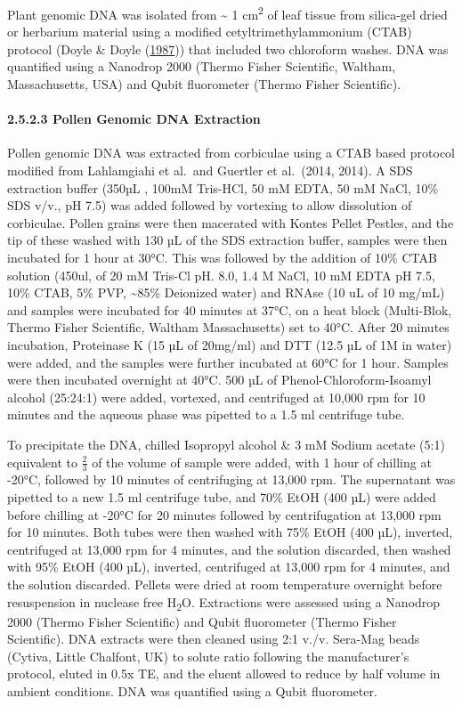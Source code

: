 \documentclass[
]{article}
\begin{document}
Plant genomic DNA was isolated from \textasciitilde{} 1
cm\textsuperscript{2} of leaf tissue from silica-gel dried or herbarium
material using a modified cetyltrimethylammonium (CTAB) protocol (Doyle
\& Doyle (\protect\hyperlink{ref-doylesCTAB}{1987})) that included two
chloroform washes. DNA was quantified using a Nanodrop 2000 (Thermo
Fisher Scientific, Waltham, Massachusetts, USA) and Qubit fluorometer
(Thermo Fisher Scientific).

\hypertarget{pollen-genomic-dna-extraction}{%
\paragraph{2.5.2.3 \textbar{} Pollen Genomic DNA
Extraction}\label{pollen-genomic-dna-extraction}}

Pollen genomic DNA was extracted from corbiculae using a CTAB based
protocol modified from Lahlamgiahi et al.~and Guertler et al.~(2014,
2014). A SDS extraction buffer (350µL , 100mM Tris-HCl, 50 mM EDTA, 50
mM NaCl, 10\% SDS v/v., pH 7.5) was added followed by vortexing to allow
dissolution of corbiculae. Pollen grains were then macerated with Kontes
Pellet Pestles, and the tip of these washed with 130 µL of the SDS
extraction buffer, samples were then incubated for 1 hour at 30°C. This
was followed by the addition of 10\% CTAB solution (450ul, of 20 mM
Tris-Cl pH. 8.0, 1.4 M NaCl, 10 mM EDTA pH 7.5, 10\% CTAB, 5\% PVP,
\textasciitilde85\% Deionized water) and RNAse (10 uL of 10 mg/mL) and
samples were incubated for 40 minutes at 37°C, on a heat block
(Multi-Blok, Thermo Fisher Scientific, Waltham Massachusetts) set to
40°C. After 20 minutes incubation, Proteinase K (15 µL of 20mg/ml) and
DTT (12.5 µL of 1M in water) were added, and the samples were further
incubated at 60°C for 1 hour. Samples were then incubated overnight at
40°C. 500 µL of Phenol-Chloroform-Isoamyl alcohol (25:24:1) were added,
vortexed, and centrifuged at 10,000 rpm for 10 minutes and the aqueous
phase was pipetted to a 1.5 ml centrifuge tube.

To precipitate the DNA, chilled Isopropyl alcohol \& 3 mM Sodium acetate
(5:1) equivalent to \(\frac{2}{3}\) of the volume of sample were added,
with 1 hour of chilling at -20°C, followed by 10 minutes of centrifuging
at 13,000 rpm. The supernatant was pipetted to a new 1.5 ml centrifuge
tube, and 70\% EtOH (400 µL) were added before chilling at -20°C for 20
minutes followed by centrifugation at 13,000 rpm for 10 minutes. Both
tubes were then washed with 75\% EtOH (400 µL), inverted, centrifuged at
13,000 rpm for 4 minutes, and the solution discarded, then washed with
95\% EtOH (400 µL), inverted, centrifuged at 13,000 rpm for 4 minutes,
and the solution discarded. Pellets were dried at room temperature
overnight before resuspension in nuclease free H\textsubscript{2}O.
Extractions were assessed using a Nanodrop 2000 (Thermo Fisher
Scientific) and Qubit fluorometer (Thermo Fisher Scientific). DNA
extracts were then cleaned using 2:1 v./v. Sera-Mag beads (Cytiva,
Little Chalfont, UK) to solute ratio following the manufacturer's
protocol, eluted in 0.5x TE, and the eluent allowed to reduce by half
volume in ambient conditions. DNA was quantified using a Qubit
fluorometer.
\end{document}
